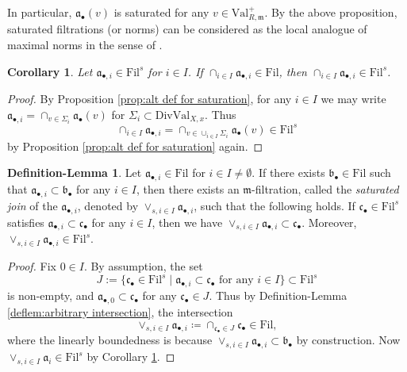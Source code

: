 \documentclass[11pt, leqno]{amsart}%
\theoremstyle{plain}
\newtheorem{corollary}[theorem]{Corollary}
\theoremstyle{definition}
\newtheorem{deflem}[theorem]{Definition-Lemma}
\theoremstyle{remark}
\newtheorem{remark}[theorem]{Remark}
\newcommand{\fa}{\mathfrak{a}}
\newcommand{\fb}{\mathfrak{b}}
\newcommand{\fc}{\mathfrak{c}}
\newcommand{\fm}{\mathfrak{m}}
\newcommand{\Val}{\mathrm{Val}}
\newcommand{\DivVal}{\mathrm{DivVal}}
\newcommand{\Fil}{\mathrm{Fil}}
\numberwithin{equation}{section}
\begin{document}
    In particular, $\fa_\bullet(v)$ is saturated for any $v\in\Val^+_{R,\fm}$. By the above proposition, saturated filtrations (or norms) can be considered as the local analogue of maximal norms in the sense of \cite[Definition 6.16]{BJ21}.

\begin{corollary}\label{cor:intersection of saturated is saturated}
    Let $\fa_{\bullet,i}\in\Fil^s$ for $i\in I$. If $\cap_{i\in I}\fa_{\bullet,i}\in\Fil$, then $\cap_{i\in I}\fa_{\bullet,i}\in\Fil^s$.
\end{corollary}

\begin{proof}
    By Proposition \ref{prop:alt def for saturation}, for any $i\in I$ we may write $\fa_{\bullet,i}=\cap_{v\in \Sigma_i}\fa_\bullet(v)$ for $\Sigma_i\subset \DivVal_{X,x}$. Thus 
    \[
        \cap_{i\in I}\fa_{\bullet,i}=\cap_{v\in \cup_{i\in I} \Sigma_i}\fa_\bullet(v)\in\Fil^s
    \]
    by Proposition \ref{prop:alt def for saturation} again.
\end{proof}

\begin{deflem}\label{deflem:saturated join}
    Let $\fa_{\bullet,i}\in\Fil$ for $i\in I\ne \emptyset$. If there exists $\fb_\bullet\in\Fil$ such that $\fa_{\bullet,i}\subset\fb_\bullet$ for any $i\in I$, then there exists an $\fm$-filtration, called the \emph{saturated join} of the $\fa_{\bullet,i}$, denoted by $\vee_{s,i\in I}\fa_{\bullet,i}$, such that the following holds. If $\fc_\bullet\in\Fil^s$ satisfies $\fa_{\bullet,i}\subset\fc_\bullet$ for any $i\in I$, then we have $\vee_{s,i\in I}\fa_{\bullet,i}\subset\fc_\bullet$. Moreover, $\vee_{s,i\in I}\fa_{\bullet,i}\in\Fil^s$.
\end{deflem}

\begin{proof}
    Fix $0\in I$. By assumption, the set
    \[
        J:=\{\fc_\bullet\in\Fil^s\mid \fa_{\bullet,i}\subset\fc_\bullet \text{ for any } i\in I\}\subset\Fil^s
    \]
    is non-empty, and $\fa_{\bullet,0}\subset\fc_\bullet$ for any $\fc_\bullet\in J$. Thus by Definition-Lemma \ref{deflem:arbitrary intersection}, the intersection
    \[
        \vee_{s,i\in I}\fa_{\bullet,i}\coloneqq\cap_{\fc_\bullet\in J}\fc_\bullet\in\Fil,
    \]
    where the linearly boundedness is because $\vee_{s,i\in I}\fa_{\bullet,i}\subset\fb_\bullet$ by construction. Now $\vee_{s,i\in I}\fa_i\in\Fil^s$ by Corollary \ref{cor:intersection of saturated is saturated}.
\end{proof}
\end{document}
